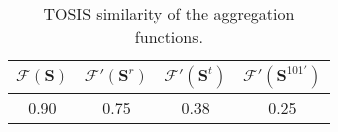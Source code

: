 \begin{table}[ht]
\centering
\caption{TOSIS similarity of the aggregation functions.}
\label{tab:pavao_topsis}
\begin{tabular}{c|c|c|c}
$\mathcal{F}(\mathbf{S})$ & $\mathcal{F'}(\mathbf{S}^r)$ & $\mathcal{F'}(\mathbf{S}^t)$ & $\mathcal{F'}(\mathbf{S}^{101'})$ \\ \hline
0.90 & 0.75 & 0.38 & 0.25
\end{tabular}
\end{table}